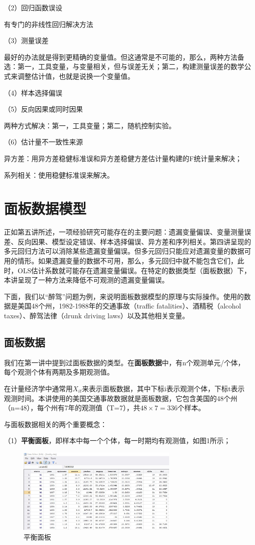 \documentclass[cn,12pt,math=newtx,citestyle=gb7714-2015,bibstyle=gb7714-2015]{elegantbook}
\begin{document}
（2）回归函数误设

有专门的非线性回归解决方法

（3）测量误差

最好的办法就是得到更精确的变量值。但这通常是不可能的，那么，两种方法备选：第一，工具变量，与变量相关，但与误差无关；第二，构建测量误差的数学公式来调整估计值，也就是说换一个变量值。

（4）样本选择偏误

（5）反向因果或同时因果

两种方式解决：第一，工具变量；第二，随机控制实验。

（6）估计量不一致性来源

异方差：用异方差稳健标准误和异方差稳健方差估计量构建的F统计量来解决；

系列相关：使用稳健标准误来解决。

\chapter{面板数据模型}

正如第五讲所述，一项经验研究可能存在的主要问题：遗漏变量偏误、变量测量误差、反向因果、模型设定错误、样本选择偏误、异方差和序列相关。第四讲呈现的多元回归方法可以消除某些遗漏变量偏误。但多元回归只能应对遗漏变量的数据可用的情形。如果遗漏变量的数据不可用，那么，多元回归中就不能包含它们，此时，OLS估计系数就可能存在遗漏变量偏误。在特定的数据类型（面板数据）下，本讲呈现了一种方法来降低不可观测的遗漏变量偏误。

下面，我们以“醉驾”问题为例，来说明面板数据模型的原理与实际操作。使用的数据是美国48个州，1982-1988年的交通事故（traffic fatalities）、酒精税（alcohol taxes）、醉驾法律（drunk driving laws）以及其他相关变量。


\section{面板数据}
我们在第一讲中提到过面板数据的类型。在\textbf{面板数据}中，有n个观测单元/个体，每个观测个体有两期及多期观测值。

在计量经济学中通常用$X_{it}$来表示面板数据，其中下标i表示观测个体，下标t表示观测时间。本讲使用的美国交通事故数据就是面板数据，它包含美国的48个州（n=48），每个州有7年的观测值（T=7），共$48\times7=336$个样本。

与面板数据相关的两个重要概念：

（1）\textbf{平衡面板}，即样本中每一个个体，每一时期均有观测值，如图1所示；

\begin{figure}[htbp]
	\centering
	\includegraphics[width=0.7\textwidth]{balancedpanel.jpg}
	\caption{平衡面板}\label{fig:digit}
\end{figure}
\end{document}
